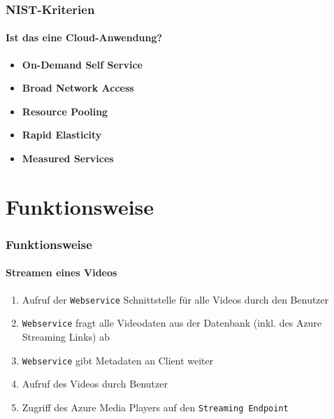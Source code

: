 \documentclass[aspectratio=169]{beamer}
\begin{document}
\begin{frame}
  \frametitle{NIST-Kriterien}
  \framesubtitle{Ist das eine Cloud-Anwendung?}
  \begin{itemize}
    \item \textbf{On-Demand Self Service}\tabto{6cm}\checkmark 
    \item \textbf{Broad Network Access}\tabto{6cm}  \checkmark   %
    \item \textbf{Resource Pooling}\tabto{6cm} \checkmark
    \item \textbf{Rapid Elasticity}\tabto{6cm}\checkmark
    \item \textbf{Measured Services}\tabto{6cm}\checkmark
  \end{itemize}
\end{frame}

\section{Funktionsweise}
\begin{frame}
  \frametitle{Funktionsweise}
  \framesubtitle{Streamen eines Videos}
  \begin{enumerate}
    \item Aufruf der \texttt{Webservice} Schnittstelle für alle Videos durch den Benutzer
    \item \texttt{Webservice} fragt alle Videodaten aus der Datenbank (inkl. des Azure Streaming Links) ab
    \item \texttt{Webservice} gibt Metadaten an Client weiter
    \item Aufruf des Videos durch Benutzer 
    \item Zugriff des Azure Media Players auf den \texttt{Streaming Endpoint}
  \end{enumerate}
\end{frame}
\end{document}
